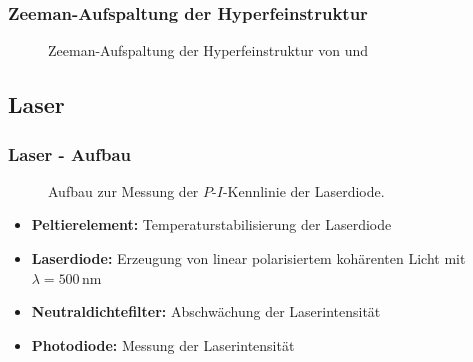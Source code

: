\begin{frame}
\frametitle{Zeeman-Aufspaltung der Hyperfeinstruktur}


\begin{figure}
    \centering
    \def\svgwidth{\textwidth}
    
    \caption{Zeeman-Aufspaltung der Hyperfeinstruktur von  und }
\end{figure}

\end{frame}





\subsection{Laser}

\begin{frame}
\frametitle{Laser - Aufbau}
\begin{figure}
    \centering
    \def\svgwidth{\textwidth}
    
    \caption{Aufbau zur Messung der $P$-$I$-Kennlinie der Laserdiode.}
\end{figure}
\begin{itemize}
  \item \textbf{Peltierelement:} Temperaturstabilisierung der Laserdiode
  \item \textbf{Laserdiode:} Erzeugung von linear polarisiertem kohärenten Licht mit $\lambda=500$\,nm
  \item \textbf{Neutraldichtefilter:} Abschwächung der Laserintensität
  \item \textbf{Photodiode:} Messung der Laserintensität
\end{itemize}
\end{frame}

